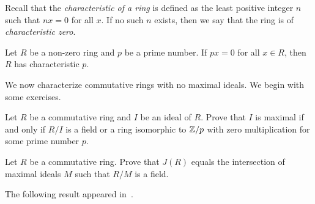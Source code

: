 Recall that the \emph{characteristic of a ring} is defined as the least positive
integer $n$ such that $nx=0$ for all $x$. If no such $n$ exists, 
then we say that the ring is of \emph{characteristic zero}. 

\begin{exercise}
\label{xca:characteristic}
    Let $R$ be a non-zero ring and $p$ be a prime number. 
    If $px=0$ for all $x\in R$, then $R$ has characteristic $p$. 
\end{exercise}

We now characterize commutative rings with no maximal ideals.
We begin with some exercises. 


\begin{exercise}
\label{xca:R/I_field_or_zero}
    Let $R$ be a commutative ring 
    and $I$ be an ideal of $R$. Prove that
    $I$ is maximal if and only if $R/I$ is a field
    or a ring isomorphic to 
    $\mathbb{Z}/p$ with zero multiplication for some prime number $p$. 
\end{exercise}

\begin{exercise}
    \label{xca:J(R)_fields}
    Let $R$ be a commutative ring. Prove that
    $J(R)$ equals the intersection of maximal ideals $M$ such that $R/M$ is a field. 
\end{exercise}

The following result appeared in~\cite{MR0424776}.


